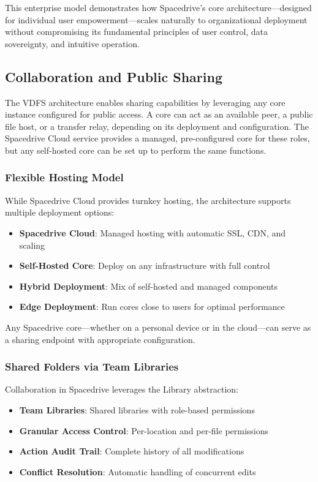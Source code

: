\documentclass[sigconf]{acmart}
\begin{document}
This enterprise model demonstrates how Spacedrive's core architecture---designed for individual user empowerment---scales naturally to organizational deployment without compromising its fundamental principles of user control, data sovereignty, and intuitive operation.

\subsection{Collaboration and Public Sharing}

The VDFS architecture enables sharing capabilities by leveraging any core instance configured for public access. A core can act as an available peer, a public file host, or a transfer relay, depending on its deployment and configuration. The Spacedrive Cloud service provides a managed, pre-configured core for these roles, but any self-hosted core can be set up to perform the same functions.

\subsubsection{Flexible Hosting Model}

While Spacedrive Cloud provides turnkey hosting, the architecture supports multiple deployment options:

\begin{itemize}
    \item \textbf{Spacedrive Cloud}: Managed hosting with automatic SSL, CDN, and scaling
    \item \textbf{Self-Hosted Core}: Deploy on any infrastructure with full control
    \item \textbf{Hybrid Deployment}: Mix of self-hosted and managed components
    \item \textbf{Edge Deployment}: Run cores close to users for optimal performance
\end{itemize}

Any Spacedrive core—whether on a personal device or in the cloud—can serve as a sharing endpoint with appropriate configuration.

\subsubsection{Shared Folders via Team Libraries}

Collaboration in Spacedrive leverages the Library abstraction:

\begin{itemize}
    \item \textbf{Team Libraries}: Shared libraries with role-based permissions
    \item \textbf{Granular Access Control}: Per-location and per-file permissions
    \item \textbf{Action Audit Trail}: Complete history of all modifications
    \item \textbf{Conflict Resolution}: Automatic handling of concurrent edits
\end{itemize}
\end{document}

